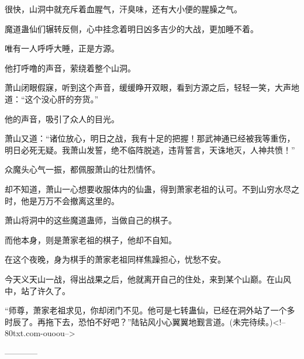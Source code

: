\begin{this_body}
很快，山洞中就充斥着血腥气，汗臭味，还有大小便的腥臊之气。

魔道蛊仙们辗转反侧，心中挂念着明日凶多吉少的大战，更加睡不着。

唯有一人呼呼大睡，正是方源。

他打呼噜的声音，萦绕着整个山洞。

萧山闭眼假寐，听到这个声音，缓缓睁开双眼，看到方源之后，轻轻一笑，大声地道：“这个没心肝的夯货。”

他的声音，吸引了众人的目光。

萧山又道：“诸位放心，明日之战，我有十足的把握！那武神通已经被我等重伤，明日必死无疑。我萧山发誓，绝不临阵脱逃，违背誓言，天诛地灭，人神共愤！”

众魔头心气一振，都佩服萧山的壮烈情怀。

却不知道，萧山一心想要收服体内的仙蛊，得到萧家老祖的认可。不到山穷水尽之时，他是万万不会撤离这里的。

萧山将洞中的这些魔道蛊师，当做自己的棋子。

而他本身，则是萧家老祖的棋子，他却不自知。

在这个夜晚，身为棋手的萧家老祖同样焦躁担心，忧愁不安。

今天义天山一战，得出战果之后，他就离开自己的住处，来到某个山巅。在山风中，站了许久了。

“师尊，萧家老祖求见，你却闭门不见。他可是七转蛊仙，已经在洞外站了一个多时辰了。再拖下去，恐怕不好吧？”陆钻风小心翼翼地觐言道。(未完待续。)<!--80txt.com-ouoou-->

------------

\end{this_body}

